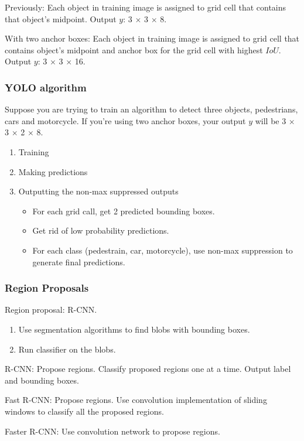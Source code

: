 \documentclass[UTF8]{article}
\newcommand{\Vector}[1]{\boldsymbol{\mathit{#1}}}   %
\begin{document}
Previously: Each object in training image is assigned to grid cell that contains that object's
midpoint. Output $\Vector{y}$: 3 $\times$ 3 $\times$ 8.

With two anchor boxes: Each object in training image is assigned to grid cell that contains object's
midpoint and anchor box for the grid cell with highest $IoU$. Output $\Vector{y}$: 3 $\times$ 3
$\times$ 16.

\subsubsection{YOLO algorithm}
Suppose you are trying to train an algorithm to detect three objects, pedestrians, cars and
motorcycle. If you're using two anchor boxes, your output $\Vector{y}$ will be 3 $\times$ 3
$\times$ 2 $\times$ 8.

\begin{enumerate}
    \item Training
    \item Making predictions
    \item Outputting the non-max suppressed outputs
    \begin{itemize}
        \item For each grid call, get 2 predicted bounding boxes.
        \item Get rid of low probability predictions.
        \item For each class (pedestrain, car, motorcycle), use non-max suppression to generate
        final predictions.
    \end{itemize}
\end{enumerate}

\subsubsection{Region Proposals}
Region proposal: R-CNN.
\begin{enumerate}
    \item Use segmentation algorithms to find blobs with bounding boxes.
    \item Run classifier on the blobs.
\end{enumerate}

R-CNN: Propose regions. Classify proposed regions one at a time. Output label and bounding boxes.

Fast R-CNN: Propose regions. Use convolution implementation of sliding windows to classify all the
proposed regions.

Faster R-CNN: Use convolution network to propose regions.
\end{document}
